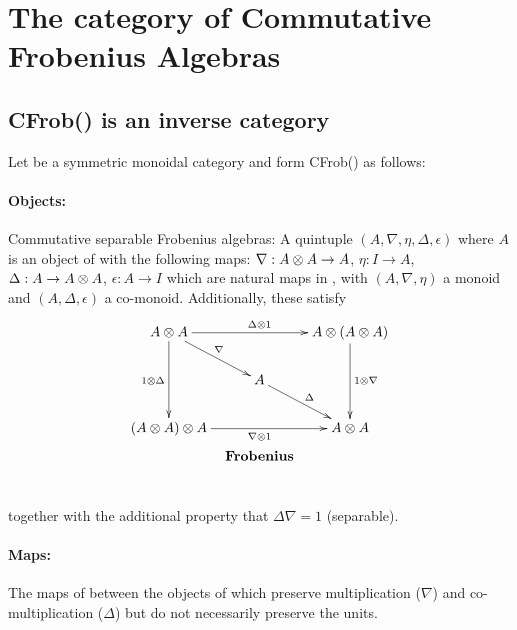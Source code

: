 \section{The category of Commutative Frobenius Algebras} %
\label{sec:the_category_of_commutative_frobenius_algebras}



\subsection{CFrob(\X) is an inverse category}\label{ssec:cfrob_x_is_an_inverse_category}
\begin{example}\label{example:commfrob}
  Let \X be a symmetric monoidal category and form CFrob(\X) as follows: \paragraph{Objects:}
  Commutative separable Frobenius algebras\cite{kock04}: A quintuple $(A,\nabla,\eta,\Delta,\epsilon)$ where
  $A$ is an object of \X with the following maps:
  $\nabla :A\otimes A \to A$, $\eta:I\to A$, $\Delta : A \to A\otimes A$, $\epsilon : A \to I$ which are natural
  maps in \X, with $(A,\nabla,\eta)$ a monoid and $(A,\Delta,\epsilon)$ a co-monoid. Additionally, these
  satisfy
  \[
    \xymatrix @C=10pt @R=20pt{
      A \* A \ar[dd]_{1\*\Delta} \ar[dr]^{\nabla}
        \ar[rr]^{\Delta \* 1} & &
        A \* (A \* A) \ar[dd]^{1 \* \nabla}\\
      & A \ar[dr]^{\Delta} & \\
      (A \* A) \* A \ar[rr]_{\nabla \* 1} & &
        A \* A\\
      &*!<0pt,-25pt>{\text{\textbf{Frobenius}}}
    }
  \]
  together with the additional property that $\Delta \nabla = 1$ (separable).

  \paragraph{Maps:} The maps of \X between the objects of \X which preserve multiplication ($\nabla$)
  and co-multiplication ($\Delta$) but do not necessarily preserve the units.
\end{example}

